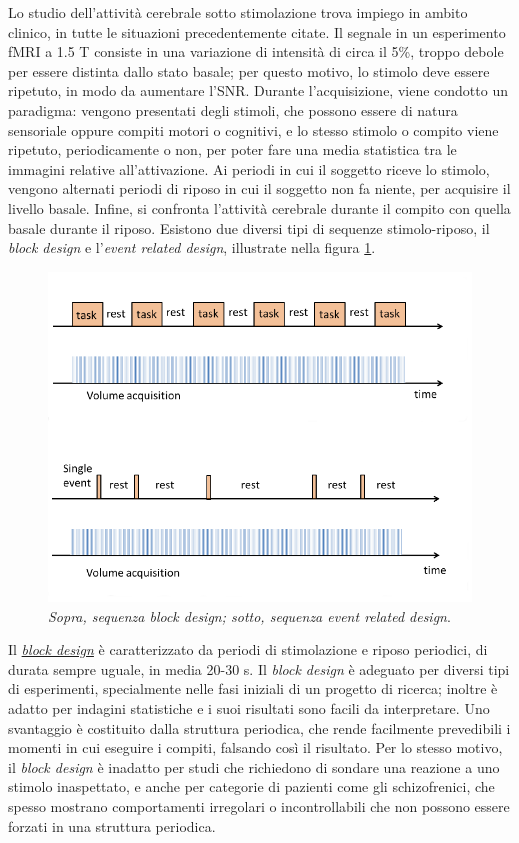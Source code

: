 \documentclass{report}
\newcommand{\figref}[1]{figura \ref{#1}}
\numberwithin{equation}{section}
\numberwithin{figure}{section}
\begin{document}
Lo studio dell'attività cerebrale sotto stimolazione trova impiego in ambito clinico, in tutte le situazioni precedentemente citate. Il segnale in un esperimento fMRI a 1.5 T consiste in una variazione di intensità di circa il 5\%, troppo debole per essere distinta dallo stato basale; per questo motivo, lo stimolo deve essere ripetuto, in modo da aumentare l'SNR. Durante l’acquisizione, viene condotto un paradigma: vengono presentati degli stimoli, che possono essere di natura sensoriale oppure compiti motori o cognitivi, e lo stesso stimolo o compito viene ripetuto, periodicamente o non, per poter fare una media statistica tra le immagini relative all'attivazione. Ai periodi in cui il soggetto riceve lo stimolo, vengono alternati periodi di riposo in cui il soggetto non fa niente, per acquisire il livello basale. Infine, si confronta l’attività cerebrale durante il compito con quella basale durante il riposo. Esistono due diversi tipi di sequenze stimolo-riposo, il \textit{block design} e l'\textit{event related design}, illustrate nella \figref{fig:design}.

\begin{figure}[htp]
\centering
\includegraphics[scale=0.75]{immagini/design.png}
\caption{\label{fig:design} \textit{Sopra, sequenza block design; sotto, sequenza event related design}.}
\end{figure}

Il \underline{\textit{block design}} è caratterizzato da periodi di stimolazione e riposo periodici, di durata sempre uguale, in media 20-30 s. Il \textit{block design} è adeguato per diversi tipi di esperimenti, specialmente nelle fasi iniziali di un progetto di ricerca; inoltre è adatto per indagini statistiche e i suoi risultati sono facili da interpretare. Uno svantaggio è costituito dalla struttura periodica, che rende facilmente prevedibili i momenti in cui eseguire i compiti, falsando così il risultato. Per lo stesso motivo, il \textit{block design} è inadatto per studi che richiedono di sondare una reazione a uno stimolo inaspettato, e anche per categorie di pazienti come gli schizofrenici, che spesso mostrano comportamenti irregolari o incontrollabili che non possono essere forzati in una struttura periodica.
\end{document}
